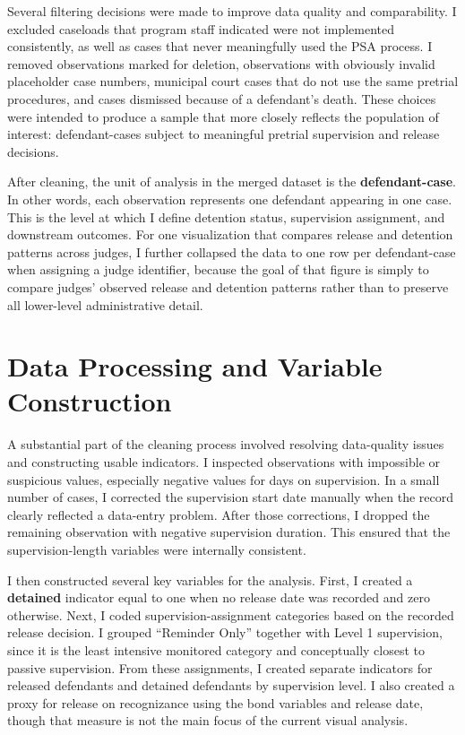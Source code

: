 \documentclass[
  11pt,
]{article}
\begin{document}
Several filtering decisions were made to improve data quality and
comparability. I excluded caseloads that program staff indicated were
not implemented consistently, as well as cases that never meaningfully
used the PSA process. I removed observations marked for deletion,
observations with obviously invalid placeholder case numbers, municipal
court cases that do not use the same pretrial procedures, and cases
dismissed because of a defendant's death. These choices were intended to
produce a sample that more closely reflects the population of interest:
defendant-cases subject to meaningful pretrial supervision and release
decisions.

After cleaning, the unit of analysis in the merged dataset is the
\textbf{defendant-case}. In other words, each observation represents one
defendant appearing in one case. This is the level at which I define
detention status, supervision assignment, and downstream outcomes. For
one visualization that compares release and detention patterns across
judges, I further collapsed the data to one row per defendant-case when
assigning a judge identifier, because the goal of that figure is simply
to compare judges' observed release and detention patterns rather than
to preserve all lower-level administrative detail.

\section{Data Processing and Variable
Construction}\label{data-processing-and-variable-construction}

A substantial part of the cleaning process involved resolving
data-quality issues and constructing usable indicators. I inspected
observations with impossible or suspicious values, especially negative
values for days on supervision. In a small number of cases, I corrected
the supervision start date manually when the record clearly reflected a
data-entry problem. After those corrections, I dropped the remaining
observation with negative supervision duration. This ensured that the
supervision-length variables were internally consistent.

I then constructed several key variables for the analysis. First, I
created a \textbf{detained} indicator equal to one when no release date
was recorded and zero otherwise. Next, I coded supervision-assignment
categories based on the recorded release decision. I grouped ``Reminder
Only'' together with Level 1 supervision, since it is the least
intensive monitored category and conceptually closest to passive
supervision. From these assignments, I created separate indicators for
released defendants and detained defendants by supervision level. I also
created a proxy for release on recognizance using the bond variables and
release date, though that measure is not the main focus of the current
visual analysis.
\end{document}
